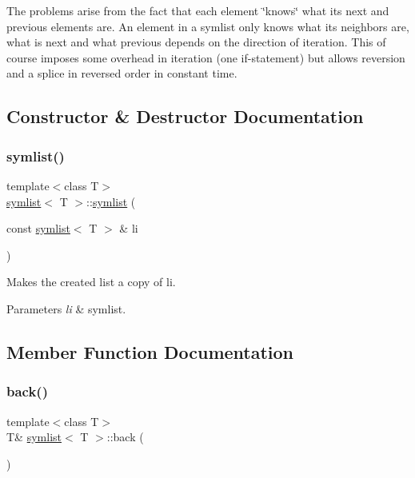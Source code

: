 The problems arise from the fact that each element \char`\"{}knows\char`\"{} what its next and previous elements are. An element in a symlist only knows what its neighbors are, what is next and what previous depends on the direction of iteration. This of course imposes some overhead in iteration (one if-\/statement) but allows reversion and a splice in reversed order in constant time. 

\subsection{Constructor \& Destructor Documentation}
\mbox{\label{classsymlist_a5c17d54592dac03b2c4d940a10153797}} 
\subsubsection{\texorpdfstring{symlist()}{symlist()}}
{\footnotesize\ttfamily template$<$class T$>$ \\
\mbox{\hyperlink{classsymlist}{symlist}}$<$ T $>$\+::\mbox{\hyperlink{classsymlist}{symlist}} (\begin{DoxyParamCaption}\item[{const \mbox{\hyperlink{classsymlist}{symlist}}$<$ T $>$ \&}]{li }\end{DoxyParamCaption})}



Makes the created list a copy of {\ttfamily li}. 


\begin{DoxyParams}{Parameters}
{\em li} & symlist. \\
\hline
\end{DoxyParams}


\subsection{Member Function Documentation}
\mbox{\label{classsymlist_abc0570ff78ded9210ac26865519d36e3}} 
\subsubsection{\texorpdfstring{back()}{back()}}
{\footnotesize\ttfamily template$<$class T$>$ \\
T\& \mbox{\hyperlink{classsymlist}{symlist}}$<$ T $>$\+::back (\begin{DoxyParamCaption}{ }\end{DoxyParamCaption})\hspace{0.3cm}{\ttfamily [inline]}}



